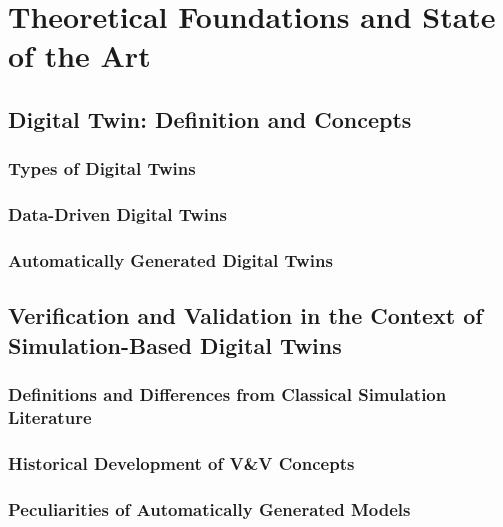 \chapter{Theoretical Foundations and State of the Art}
\label{chap:theory}

\section{Digital Twin: Definition and Concepts}
\subsection{Types of Digital Twins}

\subsection{Data-Driven Digital Twins}

\subsection{Automatically Generated Digital Twins}

\section{Verification and Validation in the Context of Simulation-Based Digital Twins}
\subsection{Definitions and Differences from Classical Simulation Literature}

\subsection{Historical Development of V\&V Concepts}

\subsection{Peculiarities of Automatically Generated Models}


